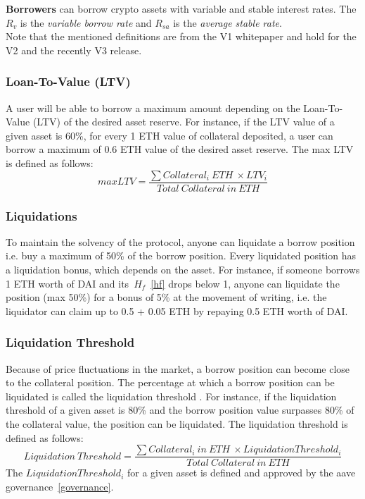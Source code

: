 \documentclass[11pt,a4paper]{report}
\begin{document}
\textbf{Borrowers} can borrow crypto assets with variable and stable interest rates. 
The $R_{v}$\cite{aaveV1RV} is the \textit{variable borrow rate} and $R_{sa}$\cite{aaveV1RS} is the \textit{average stable rate}. \\

Note that the mentioned definitions are from the V1\cite{aaveV1} whitepaper and hold for the V2\cite{aaveV2} and the recently V3\cite{aaveV3} release.

\subsubsection{Loan-To-Value (LTV)} 
A user will be able to borrow a maximum amount depending on the Loan-To-Value (LTV)\cite{aaveV1}\cite{risk} of the desired asset reserve. For instance, if the LTV value of a given asset is  60\%, for every 1 ETH value of collateral deposited, a user can borrow a maximum of 0.6 ETH value of the desired asset reserve. The max LTV is defined as follows:\[ maxLTV = \frac{\sum Collateral_{i}~ETH~\times LTV_{i}}{Total~Collateral~in~ETH} \]
\subsubsection{Liquidations}\cite{aaveV1}\cite{liquidation} 
To maintain the solvency of the protocol, anyone can liquidate a borrow position i.e. buy a maximum of 50\% of the borrow position. Every liquidated position has a liquidation bonus, which depends on the asset. For instance, if someone borrows 1 ETH worth of DAI and its~$H_{f}$~\ref{hf} drops below 1, anyone can liquidate the position (max 50\%) for a bonus of 5\% at the movement of writing, i.e. the liquidator can claim up to 0.5 + 0.05 ETH by repaying 0.5 ETH worth of DAI.
\subsubsection{Liquidation Threshold}
Because of price fluctuations in the market, a borrow position can become close to the collateral position. The percentage at which a borrow position can be liquidated is called the liquidation threshold\cite{aaveV1}\cite{risk} . For instance, if the liquidation threshold of a given asset is 80\% and the borrow position value surpasses 80\% of the collateral value, the position can be liquidated. The liquidation threshold is defined as follows:
\[ Liquidation~Threshold = \frac{\sum Collateral_{i}~in~ETH~\times Liquidation Threshold_{i}}{Total~Collateral~in~ETH} \]
The $Liquidation Threshold_{i}$ for a given asset is defined and approved by the aave governance~\ref{governance}.
\end{document}
